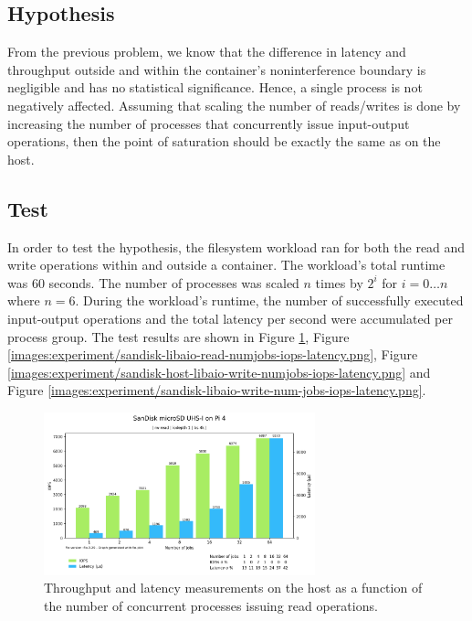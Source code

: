 \subsection{Hypothesis}
From the previous problem, we know that the difference in latency and throughput outside 
and within the container's noninterference boundary is negligible and has no statistical significance.
Hence, a single process is not negatively affected. Assuming that scaling the number of reads/writes 
is done by increasing the number of processes that concurrently issue input-output operations, then 
the point of saturation should be exactly the same as on the host.

\subsection{Test}
In order to test the hypothesis, the filesystem workload ran for both the read and write 
operations within and outside a container. The workload's total runtime was 60 seconds.
The number of processes was scaled $n$ times by $2^{i}$ for $i = 0\hdots n$ where $n = 6$. 
During the workload's runtime, the number of successfully executed input-output operations and the total latency per second 
were accumulated per process group. The test results are shown in Figure \ref{images:experiment/sandisk-host-libaio-read-numjobs-iops-latency.png},
Figure \ref{images:experiment/sandisk-libaio-read-numjobs-iops-latency.png}, Figure \ref{images:experiment/sandisk-host-libaio-write-numjobs-iops-latency.png}
and Figure \ref{images:experiment/sandisk-libaio-write-num-jobs-iops-latency.png}.

\begin{figure}[H]
    \centering
    \includegraphics[width=0.7\textwidth]{images/results/sandisk-host-libaio-read-numjobs-iops-latency.png}
    \caption{Throughput and latency measurements on the host as a function of the number of concurrent processes issuing read operations.}
    \label{images:experiment/sandisk-host-libaio-read-numjobs-iops-latency.png}
\end{figure}

